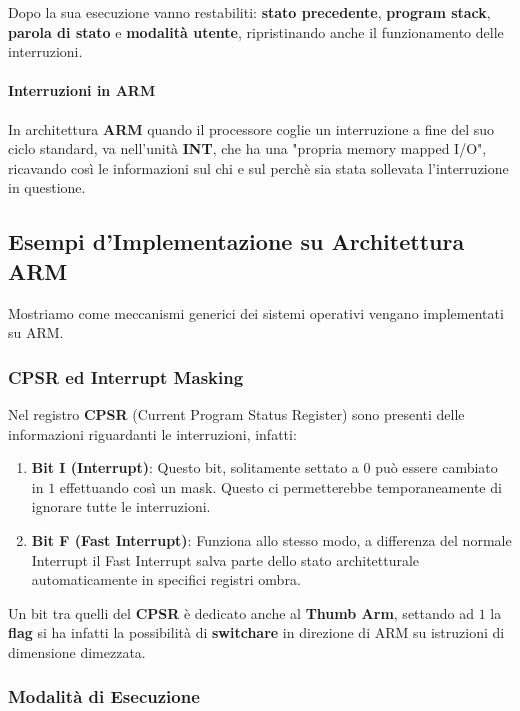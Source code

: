 \documentclass{article}
\begin{document}
Dopo la sua esecuzione vanno restabiliti: \textbf{stato precedente}, \textbf{program stack}, \textbf{parola di stato} e \textbf{modalità utente}, ripristinando anche il funzionamento delle interruzioni.

\paragraph{Interruzioni in ARM} In architettura \textbf{ARM} quando il processore coglie un interruzione a fine del suo ciclo standard, va nell'unità \textbf{INT}, che ha una "propria memory mapped I/O", ricavando così le informazioni sul chi e sul perchè sia stata sollevata l'interruzione in questione.

\newpage

\subsection{Esempi d'Implementazione su Architettura ARM}

Mostriamo come meccanismi generici dei sistemi operativi vengano implementati su ARM.

\subsubsection{CPSR ed Interrupt Masking}

Nel registro \textbf{CPSR} (Current Program Status Register) sono presenti delle informazioni riguardanti le interruzioni, infatti:

\begin{enumerate}
    \item \textbf{Bit I (Interrupt)}: Questo bit, solitamente settato a $0$ può essere cambiato in $1$ effettuando così un mask. Questo ci permetterebbe temporaneamente di ignorare tutte le interruzioni.
    \item \textbf{Bit F (Fast Interrupt)}: Funziona allo stesso modo, a differenza del normale Interrupt il Fast Interrupt salva parte dello stato architetturale automaticamente in specifici registri ombra.
\end{enumerate}

Un bit tra quelli del \textbf{CPSR} è dedicato anche al \textbf{Thumb Arm}, settando ad $1$ la \textbf{flag} si ha infatti la possibilità di \textbf{switchare} in direzione di ARM su istruzioni di dimensione dimezzata.

\subsubsection{Modalità di Esecuzione}
\end{document}
